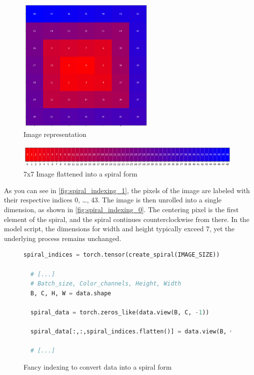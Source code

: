     
    \begin{figure}[H]
    \centering
    \includegraphics[width=0.6\textwidth]{../code/dataAnalysis/plots/exampleImgs/spiralShowcase1.png}
    \caption{Image representation}
    \label{fig:spiral_indexing_1}        
    \end{figure}

    \begin{figure}[H]
    \centering
    \includegraphics[width=1\textwidth]{../code/dataAnalysis/plots/exampleImgs/spiralShowcase0.png}
    \caption{7x7 Image flattened into a spiral form} 
    \label{fig:spiral_indexing_0}        
    \end{figure}

    As you can see in \autoref{fig:spiral_indexing_1}, the pixels of the image are labeled with their respective indices 0, \dots, 43. The image is then unrolled into a single dimension, as shown in \autoref{fig:spiral_indexing_0}. The centering pixel is the first element of the spiral, and the spiral continues counterclockwise from there. In the model script, the dimensions for width and height typically exceed 7, yet the underlying process remains unchanged.

\begin{figure}[H]
\centering
\begin{lstlisting}[language=Python]
  spiral_indices = torch.tensor(create_spiral(IMAGE_SIZE))

  # [...]
  # Batch_size, Color_channels, Height, Width
  B, C, H, W = data.shape

  spiral_data = torch.zeros_like(data.view(B, C, -1))

  spiral_data[:,:,spiral_indices.flatten()] = data.view(B, C, -1)

  # [...]
\end{lstlisting}
\caption{Fancy indexing to convert data into a spiral form}
\label{fig:spiral_indexing_code}
\end{figure}


